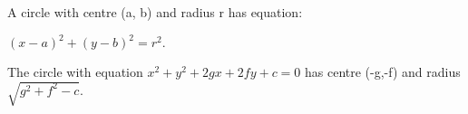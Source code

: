 A circle with centre (a, b) and radius r has equation:
\par $(x-a)^{2}+(y-b)^{2}=r^{2}.$ 
\par
The circle with equation $x^{2}+y^{2}+2gx+2fy+c=0$ 
has centre (-g,-f) and radius $ \sqrt {g^2 + f^2 -c } . $
